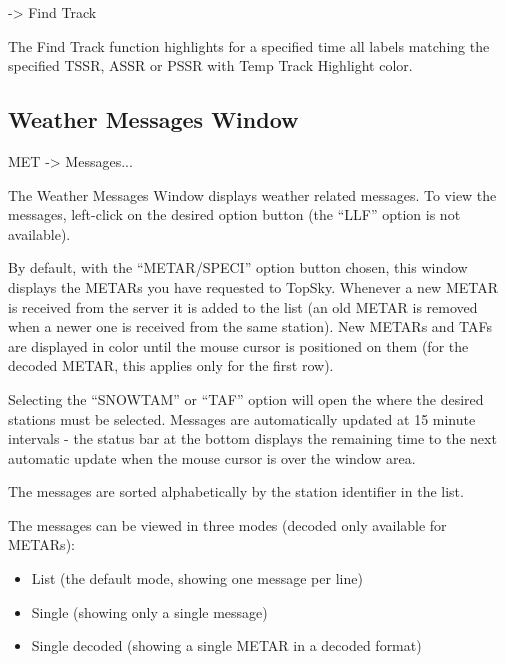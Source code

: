 \documentclass[a4paper,oneside,11pt]{memoir}
\begin{document}
 -> Find Track 

\bigskip

The Find Track function highlights for a specified time all labels matching the specified TSSR, ASSR or PSSR with Temp Track Highlight color.

\subsection{Weather Messages Window}
\label{win:wxmw}

 MET -> Messages...

\bigskip


The Weather Messages Window displays weather related messages. To view the messages, left-click on the desired option button (the “LLF” option is not available).

\bigskip

By default, with the “METAR/SPECI” option button chosen, this window displays the METARs you have requested to TopSky. Whenever a new METAR is received from the server it is added to the list (an old METAR is removed when a newer one is received from the same station). New METARs and TAFs are displayed in  color until the mouse cursor is positioned on them (for the decoded METAR, this applies only for the first row).

\bigskip

Selecting the “SNOWTAM” or “TAF” option will open the  where the desired stations must be selected. Messages are automatically updated at 15 minute intervals - the status bar at the bottom displays the remaining time to the next automatic update when the mouse cursor is over the window area.

\bigskip

The messages are sorted alphabetically by the station identifier in the list.

\bigskip

The messages can be viewed in three modes (decoded only available for METARs):

\begin{itemize}
    \item List (the default mode, showing one message per line)
    \item Single (showing only a single message)
    \item Single decoded (showing a single METAR in a decoded format)
\end{itemize}
\end{document}

